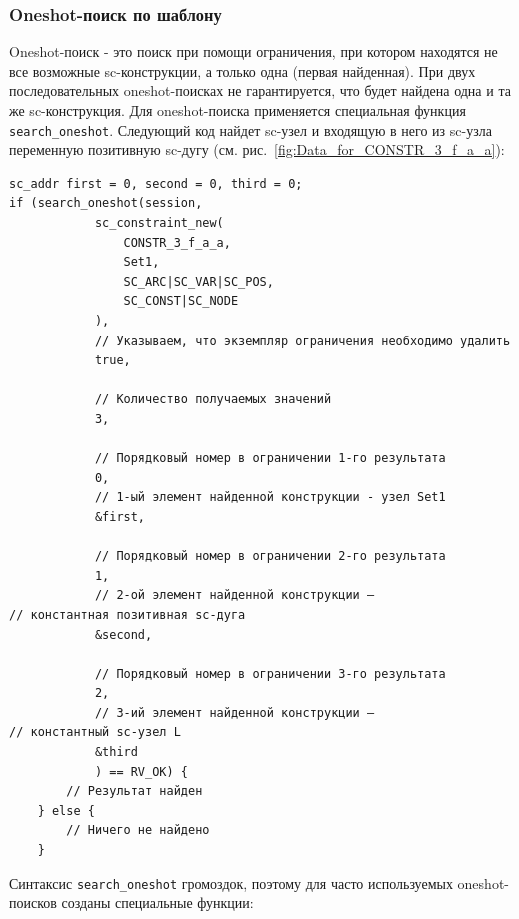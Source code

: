 \subsubsection{Oneshot-поиск по шаблону}

Oneshot-поиск - это поиск при помощи ограничения, при котором
находятся не все возможные sc-конструкции, а только одна (первая
найденная). При двух последовательных oneshot-поисках не
гарантируется, что будет найдена одна и та же sc-конструкция. Для
oneshot-поиска применяется специальная функция
\lstinline|search_oneshot|. Следующий код найдет sc-узел  и
входящую в него из sc-узла  переменную позитивную sc-дугу
(см. рис.~\ref{fig:Data_for_CONSTR_3_f_a_a}):
\begin{lstlisting}[texcl]
sc_addr first = 0, second = 0, third = 0; 
if (search_oneshot(session,
            sc_constraint_new(
                CONSTR_3_f_a_a,
                Set1,
                SC_ARC|SC_VAR|SC_POS,
                SC_CONST|SC_NODE
            ),
            // Указываем, что экземпляр ограничения необходимо удалить
            true,

            // Количество получаемых значений
            3,

            // Порядковый номер в ограничении 1-го результата
            0,
            // 1-ый элемент найденной конструкции - узел Set1
            &first,
            
            // Порядковый номер в ограничении 2-го результата
            1,
            // 2-ой элемент найденной конструкции –
// константная позитивная sc-дуга
            &second,

            // Порядковый номер в ограничении 3-го результата
            2,
            // 3-ий элемент найденной конструкции –
// константный sc-узел L
            &third
            ) == RV_OK) {
        // Результат найден
    } else {
        // Ничего не найдено
    }
\end{lstlisting}

Синтаксис \lstinline|search_oneshot| громоздок, поэтому для часто
используемых oneshot-поисков созданы специальные функции:

